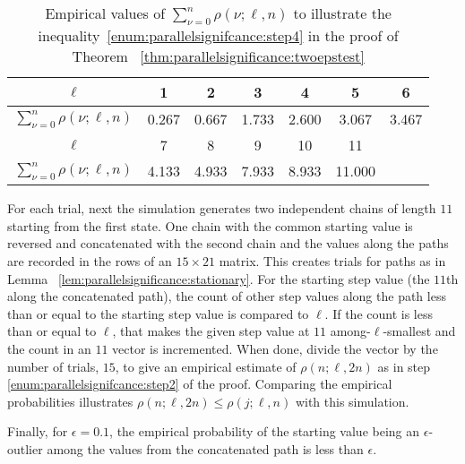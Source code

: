 \documentclass[12pt]{article}
\begin{document}
\begin{example}
    \begin{table}
        \centering
        \begin{tabular}{c|cccccc}
            \( \ell \)                              & 1     & 2     & 3     & 4     & 5      & 6     \\ 
            \hline
            \( \sum_{\nu=0}^n \rho(\nu; \ell, n) \) & 0.267 & 0.667 & 1.733 & 2.600 & 3.067  & 3.467 \\ 
            \( \ell \)                             & 7     & 8     & 9     & 10    & 11     &       \\
            \hline
            \( \sum_{\nu=0}^n \rho(\nu; \ell, n) \) & 4.133 & 4.933 & 7.933 & 8.933 & 11.000 &       \\ 
        \end{tabular}
        \caption{Empirical values of \( \sum_{\nu=0}^n \rho(\nu; \ell, n)
        \) to illustrate the inequality~\eqref{enum:parallelsignifcance:step4}
        in the proof of Theorem~%
        \ref{thm:parallelsignificance:twoepstest}}%
        \label{tab:parallelsignificance:sumofrhoprobs}
    \end{table}

    For each trial, next the simulation generates two independent chains
    of length \( 11 \) starting from the first state.  One chain with
    the common starting value is reversed and concatenated with the
    second chain and the values along the paths are recorded in the rows
    of an \( 15 \times 21 \) matrix.  This creates trials for paths as
    in Lemma~%
    \ref{lem:parallelsignificance:stationary}.  For the starting step
    value (the \( 11 \)th along the concatenated path), the count of other
    step values along the path less than or equal to the starting step
    value is compared to \( \ell \).  If the count is less than or equal
    to \( \ell \), that makes the given step value at \( 11 \) among-\(
    \ell \)-smallest and the count in an \( 11 \) vector is incremented.
    When done, divide the vector by the number of trials, \( 15 \), to
    give an empirical estimate of \( \rho(n; \ell , 2n) \) as in step~%
    \ref{enum:parallelsignifcance:step2} of the proof.  Comparing the
    empirical probabilities illustrates \( \rho(n; \ell, 2n) \le \rho(j;
    \ell, n) \) with this simulation.

    Finally, for \( \epsilon = 0.1 \), the empirical probability of the
    starting value being an \( \epsilon \)-outlier among the values from
    the concatenated path is less than \( \epsilon \).
\end{example}
\end{document}

